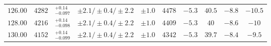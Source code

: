 \begin{table}[ht!]
\begin{center}
\begin{small}
\begin{tabular}{cccccccc|cc}
$126.00$ & $4282$ & $^{+0.14}_{-0.097}$ & $\pm 2.1/\pm 0.4/\pm 2.2$ & $\pm 1.0$ & $4478$ & $-5.3$ & $40.5$ & $-8.8$ & $-10.5$ \\
$128.00$ & $4216$ & $^{+0.14}_{-0.098}$ & $\pm 2.1/\pm 0.4/\pm 2.2$ & $\pm 1.0$ & $4409$ & $-5.3$ & $40  $ & $-8.6$ & $-10  $ \\
$130.00$ & $4152$ & $^{+0.14}_{-0.099}$ & $\pm 2.1/\pm 0.4/\pm 2.2$ & $\pm 1.0$ & $4342$ & $-5.3$ & $39.7$ & $-8.4$ & $-9.5 $ \\
\bottomrule
\end{tabular}%
\end{small}%
\end{center}%
\end{table}












































